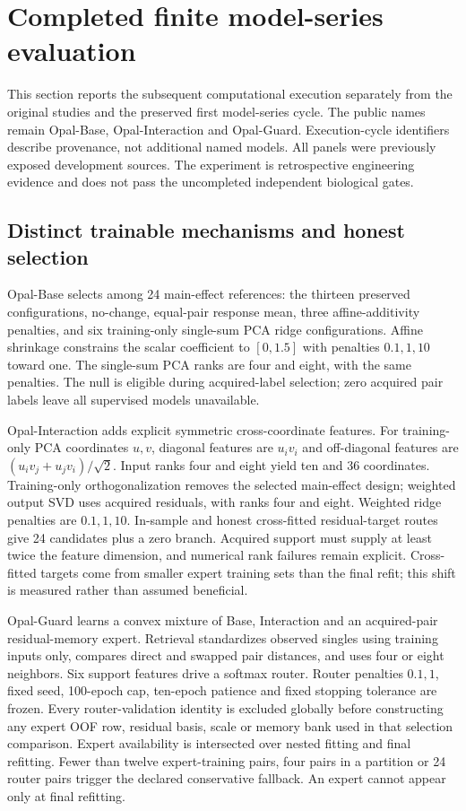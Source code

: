 \clearpage
\section{Completed finite model-series evaluation}
This section reports the subsequent computational execution separately from the original studies and the preserved first model-series cycle. The public names remain Opal-Base, Opal-Interaction and Opal-Guard. Execution-cycle identifiers describe provenance, not additional named models. All panels were previously exposed development sources. The experiment is retrospective engineering evidence and does not pass the uncompleted independent biological gates.

\subsection{Distinct trainable mechanisms and honest selection}
Opal-Base selects among 24 main-effect references: the thirteen preserved configurations, no-change, equal-pair response mean, three affine-additivity penalties, and six training-only single-sum PCA ridge configurations. Affine shrinkage constrains the scalar coefficient to $[0,1.5]$ with penalties $0.1,1,10$ toward one. The single-sum PCA ranks are four and eight, with the same penalties. The null is eligible during acquired-label selection; zero acquired pair labels leave all supervised models unavailable.

Opal-Interaction adds explicit symmetric cross-coordinate features. For training-only PCA coordinates $u,v$, diagonal features are $u_i v_i$ and off-diagonal features are $(u_i v_j+u_j v_i)/\sqrt{2}$. Input ranks four and eight yield ten and 36 coordinates. Training-only orthogonalization removes the selected main-effect design; weighted output SVD uses acquired residuals, with ranks four and eight. Weighted ridge penalties are $0.1,1,10$. In-sample and honest cross-fitted residual-target routes give 24 candidates plus a zero branch. Acquired support must supply at least twice the feature dimension, and numerical rank failures remain explicit. Cross-fitted targets come from smaller expert training sets than the final refit; this shift is measured rather than assumed beneficial.

Opal-Guard learns a convex mixture of Base, Interaction and an acquired-pair residual-memory expert. Retrieval standardizes observed singles using training inputs only, compares direct and swapped pair distances, and uses four or eight neighbors. Six support features drive a softmax router. Router penalties $0.1,1$, fixed seed, 100-epoch cap, ten-epoch patience and fixed stopping tolerance are frozen. Every router-validation identity is excluded globally before constructing any expert OOF row, residual basis, scale or memory bank used in that selection comparison. Expert availability is intersected over nested fitting and final refitting. Fewer than twelve expert-training pairs, four pairs in a partition or 24 router pairs trigger the declared conservative fallback. An expert cannot appear only at final refitting.

